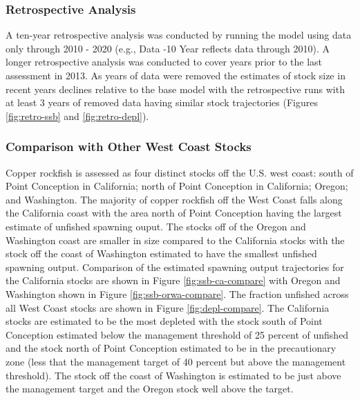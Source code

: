 \documentclass[11pt,
  english,
  a4paper,
]{article}
\begin{document}
\leavevmode\tagmcend\tagstructend\par


\hypertarget{retrospective-analysis}{%
\subsubsection{Retrospective Analysis}\label{retrospective-analysis}}

\leavevmode\tagmcend\tagstructend


A ten-year retrospective analysis was conducted by running the model using data only through 2010 - 2020 (e.g., Data -10 Year reflects data through 2010). A longer retrospective analysis was conducted to cover years prior to the last assessment in 2013. As years of data were removed the estimates of stock size in recent years declines relative to the base model with the retrospective runs with at least 3 years of removed data having similar stock trajectories (Figures \ref{fig:retro-ssb} and \ref{fig:retro-depl}).

\leavevmode\tagmcend\tagstructend\par


\hypertarget{comparison-with-other-west-coast-stocks}{%
\subsubsection{Comparison with Other West Coast Stocks}\label{comparison-with-other-west-coast-stocks}}

\leavevmode\tagmcend\tagstructend


Copper rockfish is assessed as four distinct stocks off the U.S. west coast: south of Point Conception in California; north of Point Conception in California; Oregon; and Washington. The majority of copper rockfish off the West Coast falls along the California coast with the area north of Point Conception having the largest estimate of unfished spawning ouput. The stocks off of the Oregon and Washington coast are smaller in size compared to the California stocks with the stock off the coast of Washington estimated to have the smallest unfished spawning output. Comparison of the estimated spawning output trajectories for the California stocks are shown in Figure \ref{fig:ssb-ca-compare} with Oregon and Washington shown in Figure \ref{fig:ssb-orwa-compare}. The fraction unfished across all West Coast stocks are shown in Figure \ref{fig:depl-compare}. The California stocks are estimated to be the most depleted with the stock south of Point Conception estimated below the management threshold of 25 percent of unfished and the stock north of Point Conception estimated to be in the precautionary zone (less that the management target of 40 percent but above the management threshold). The stock off the coast of Washington is estimated to be just above the management target and the Oregon stock well above the target.
\end{document}

